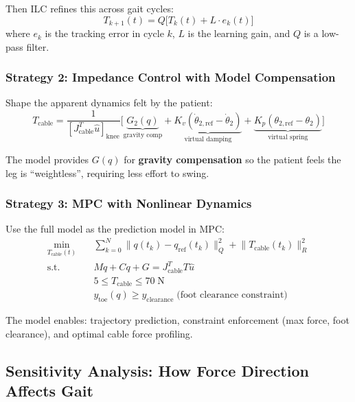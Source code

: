 \documentclass[11pt,a4paper]{article}
\newcommand{\vc}[1]{\bm{#1}}
\newcommand{\mat}[1]{\bm{#1}}
\newcommand{\dt}[1]{\dot{#1}}
\newcommand{\ddt}[1]{\ddot{#1}}
\def\vc#1{#1}%
\def\mat#1{#1}%
\def\dt#1{#1}%
\def\ddt#1{#1}%
\def\bm#1{#1}%
\begin{document}
Then ILC refines this across gait cycles:
\begin{equation}
    T_{k+1}(t) = Q\bigl[T_k(t) + L \cdot e_k(t)\bigr]
\end{equation}
where $e_k$ is the tracking error in cycle $k$, $L$ is the learning gain,
and $Q$ is a low-pass filter.

\subsubsection{Strategy 2: Impedance Control with Model Compensation}

Shape the apparent dynamics felt by the patient:
\begin{equation}
    T_{\text{cable}} = \frac{1}{[\vc{J}_{\text{cable}}^T \hat{\vc{u}}]_{\text{knee}}} \bigl[
        \underbrace{\vc{G}_2(\vc{q})}_{\text{gravity comp}}
        + \underbrace{K_v (\dot{\theta}_{2,\text{ref}} - \dot{\theta}_2)}_{\text{virtual damping}}
        + \underbrace{K_p (\theta_{2,\text{ref}} - \theta_2)}_{\text{virtual spring}}
    \bigr]
    \label{eq:impedance_control}
\end{equation}

The model provides $\vc{G}(\vc{q})$ for \textbf{gravity compensation}
so the patient feels the leg is ``weightless'', requiring less effort to swing.

\subsubsection{Strategy 3: MPC with Nonlinear Dynamics}

Use the full model as the prediction model in MPC:
\begin{align}
    \min_{T_{\text{cable}}(t)} \quad & \sum_{k=0}^{N} \bigl\|\vc{q}(t_k) - \vc{q}_{\text{ref}}(t_k)\bigr\|_{\vc{Q}}^2
        + \bigl\|T_{\text{cable}}(t_k)\bigr\|_R^2 \\
    \text{s.t.} \quad & \mat{M}\ddt{\vc{q}} + \vc{C}\dt{\vc{q}} + \vc{G} = \vc{J}_{\text{cable}}^T T \hat{\vc{u}} \\
    & 5 \leq T_{\text{cable}} \leq 70 \;\text{N} \\
    & y_{\text{toe}}(\vc{q}) \geq y_{\text{clearance}} \;\text{(foot clearance constraint)}
\end{align}

The model enables: trajectory prediction, constraint enforcement (max force,
foot clearance), and optimal cable force profiling.

\subsection{Sensitivity Analysis: How Force Direction Affects Gait}
\end{document}
